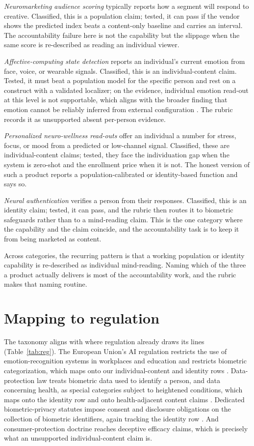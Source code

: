 \documentclass[sigconf,review,anonymous]{acmart}
\begin{document}
\emph{Neuromarketing audience scoring} typically reports how a segment will respond to creative. Classified,
this is a population claim; tested, it can pass if the vendor shows the predicted index beats a content-only
baseline and carries an interval. The accountability failure here is not the capability but the slippage when
the same score is re-described as reading an individual viewer.

\emph{Affective-computing state detection} reports an individual's current emotion from face, voice, or
wearable signals. Classified, this is an individual-content claim. Tested, it must beat a population model for
the specific person and rest on a construct with a validated localizer; on the evidence, individual emotion
read-out at this level is not supportable, which aligns with the broader finding that emotion cannot be
reliably inferred from external configuration \cite{barrett2019}. The rubric records it as unsupported absent
per-person evidence.

\emph{Personalized neuro-wellness read-outs} offer an individual a number for stress, focus, or mood from a
predicted or low-channel signal. Classified, these are individual-content claims; tested, they face the
individuation gap when the system is zero-shot and the enrollment price when it is not. The honest version of
such a product reports a population-calibrated or identity-based function and says so.

\emph{Neural authentication} verifies a person from their responses. Classified, this is an identity claim;
tested, it can pass, and the rubric then routes it to biometric safeguards rather than to a mind-reading
claim. This is the one category where the capability and the claim coincide, and the accountability task is
to keep it from being marketed as content.

Across categories, the recurring pattern is that a working population or identity capability is re-described
as individual mind-reading. Naming which of the three a product actually delivers is most of the
accountability work, and the rubric makes that naming routine.

\section{Mapping to regulation}
The taxonomy aligns with where regulation already draws its lines (Table~\ref{tab:reg}). The European Union's
AI regulation restricts the use of emotion-recognition systems in workplaces and education and restricts
biometric categorization, which maps onto our individual-content and identity rows \cite{euaiact2024}.
Data-protection law treats biometric data used to identify a person, and data concerning health, as special
categories subject to heightened conditions, which maps onto the identity row and onto health-adjacent
content claims \cite{gdpr2016}. Dedicated biometric-privacy statutes impose consent and disclosure
obligations on the collection of biometric identifiers, again tracking the identity row \cite{bipa2008}. And
consumer-protection doctrine reaches deceptive efficacy claims, which is precisely what an unsupported
individual-content claim is.
\end{document}

